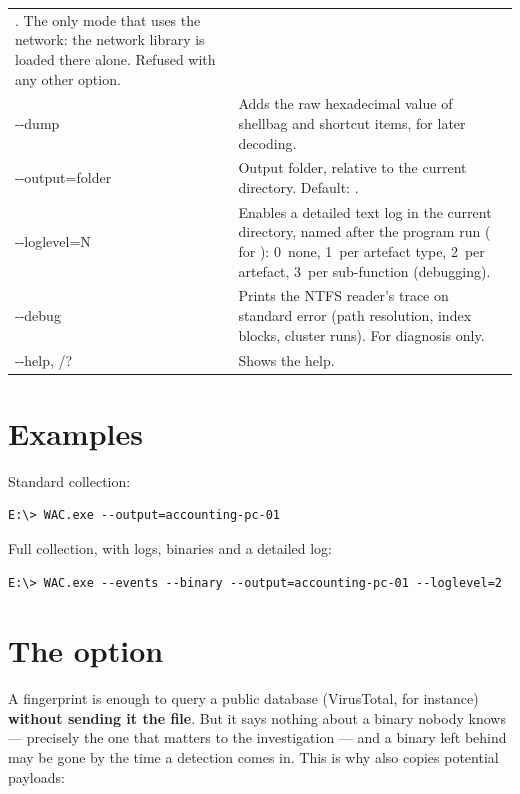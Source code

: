\documentclass[11pt,a4paper,oneside]{report}
\begin{document}
\begin{longtable}{@{}>{\ttfamily}L{3.2cm}L{11.2cm}@{}}
  . The only mode that uses the network: the network library
  is loaded there alone. Refused with any other option. \\
-{}-dump & Adds the raw hexadecimal value of shellbag and  shortcut
  items, for later decoding. \\
-{}-output=folder & Output folder, relative to the current directory. Default:
  . \\
-{}-loglevel=N & Enables a detailed text log in the current directory, named
  after the program run ( for ): 0~none,
  1~per artefact type, 2~per artefact, 3~per sub-function (debugging). \\
-{}-debug & Prints the NTFS reader's trace on standard error (path resolution,
  index blocks, cluster runs). For diagnosis only. \\
-{}-help, /? & Shows the help. \\
\bottomrule
\end{longtable}

\section{Examples}

Standard collection:
\begin{lstlisting}
E:\> WAC.exe --output=accounting-pc-01
\end{lstlisting}

Full collection, with logs, binaries and a detailed log:
\begin{lstlisting}
E:\> WAC.exe --events --binary --output=accounting-pc-01 --loglevel=2
\end{lstlisting}

\section{The  option}\label{sec:binary}

A fingerprint is enough to query a public database (VirusTotal, for instance)
\textbf{without sending it the file}. But it says nothing about a binary nobody
knows — precisely the one that matters to the investigation — and a binary left
behind may be gone by the time a detection comes in. This is why 
also copies potential payloads:
\end{document}
